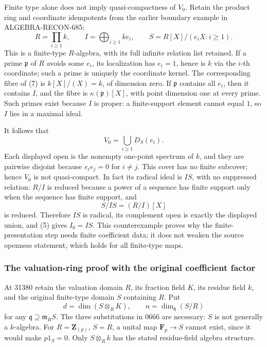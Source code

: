 Finite type alone does not imply quasi-compactness of \(V_0\). Retain the product ring and coordinate idempotents from the earlier boundary example in ALGEBRA-RECON-685: \[
 R=\prod_{i\geq1}k,\qquad
 I=\bigoplus_{i\geq1}k e_i,\qquad
 S=R[X]/(e_iX:i\geq1).
 \tag{7}
\] This is a finite-type \(R\)-algebra, with its full infinite relation list retained. If a prime \(\mathfrak p\) of \(R\) avoids some \(e_i\), its localization has \(e_i=1\), hence is \(k\) via the \(i\)-th coordinate; such a prime is uniquely the coordinate kernel. The corresponding fibre of (7) is \(k[X]/(X)=k\), of dimension zero. If \(\mathfrak p\) contains all \(e_i\), then it contains \(I\), and the fibre is \(\kappa(\mathfrak p)[X]\), with point dimension one at every prime. Such primes exist because \(I\) is proper: a finite-support element cannot equal \(1\), so \(I\) lies in a maximal ideal.

It follows that \[
 V_0=\bigcup_{i\geq1}D_S(e_i).
\] Each displayed open is the nonempty one-point spectrum of \(k\), and they are pairwise disjoint because \(e_ie_j=0\) for \(i\ne j\). This cover has no finite subcover; hence \(V_0\) is not quasi-compact. In fact its radical ideal is \(IS\), with no suppressed relation: \(R/I\) is reduced because a power of a sequence has finite support only when the sequence has finite support, and \[
 S/IS=(R/I)[X]
\] is reduced. Therefore \(IS\) is radical, its complement open is exactly the displayed union, and (5) gives \(I_0=IS\). This counterexample proves why the finite-presentation step needs finite coefficient data; it does not weaken the source openness statement, which holds for all finite-type maps.

\subsubsection{The valuation-ring proof with the original coefficient factor}\label{the-valuation-ring-proof-with-the-original-coefficient-factor}

At 31380 retain the valuation domain \(R\), its fraction field \(K\), its residue field \(k\), and the original finite-type domain \(S\) containing \(R\). Put \[
 d=\dim(S\otimes_R K),\qquad
 n=\dim_{\mathfrak q}(S/R)
\] for any \(\mathfrak q\supseteq\mathfrak m_R S\). The three substitutions in 0666 are necessary: \(S\) is not generally a \(k\)-algebra. For \(R=\mathbf Z_{(p)}\), \(S=R\), a unital map \(\mathbf F_p\to S\) cannot exist, since it would make \(p1_S=0\). Only \(S\otimes_R k\) has the stated residue-field algebra structure.

